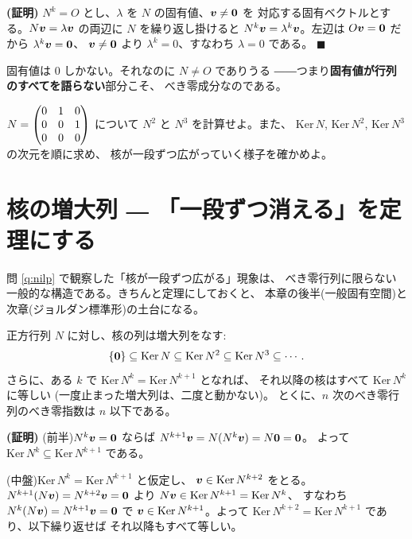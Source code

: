 \noindent\textbf{(証明)}\quad
$N^k = O$ とし、$\lambda$ を $N$ の固有値、$\bm{v} \neq \bm{0}$ を
対応する固有ベクトルとする。$N\bm{v} = \lambda\bm{v}$ の両辺に
$N$ を繰り返し掛けると $N^k\bm{v} = \lambda^k\bm{v}$。左辺は
$O\bm{v} = \bm{0}$ だから $\lambda^k\bm{v} = \bm{0}$、
$\bm{v} \neq \bm{0}$ より $\lambda^k = 0$、すなわち $\lambda = 0$ である。
$\blacksquare$

固有値は $0$ しかない。それなのに $N \neq O$ でありうる
――つまり\textbf{固有値が行列のすべてを語らない}部分こそ、
べき零成分なのである。

\begin{mondai}\label{q:nilp}
$N = \begin{pmatrix}0 & 1 & 0 \\ 0 & 0 & 1 \\ 0 & 0 & 0\end{pmatrix}$ について
$N^2$ と $N^3$ を計算せよ。また、
$\mathrm{Ker}\,N$, $\mathrm{Ker}\,N^2$, $\mathrm{Ker}\,N^3$ の次元を順に求め、
核が一段ずつ広がっていく様子を確かめよ。
\end{mondai}

\section{核の増大列 ― 「一段ずつ消える」を定理にする}

問 \ref{q:nilp} で観察した「核が一段ずつ広がる」現象は、
べき零行列に限らない一般的な構造である。きちんと定理にしておくと、
本章の後半(一般固有空間)と次章(ジョルダン標準形)の土台になる。

\begin{teiri}[核の増大列]\label{thm:nilp-chain}
正方行列 $N$ に対し、核の列は増大列をなす:
\[
\{\bm{0}\} \subseteq \mathrm{Ker}\,N \subseteq \mathrm{Ker}\,N^2
\subseteq \mathrm{Ker}\,N^3 \subseteq \cdots.
\]
さらに、ある $k$ で $\mathrm{Ker}\,N^k = \mathrm{Ker}\,N^{k+1}$ となれば、
それ以降の核はすべて $\mathrm{Ker}\,N^k$ に等しい
(一度止まった増大列は、二度と動かない)。
とくに、$n$ 次のべき零行列のべき零指数は $n$ 以下である。
\end{teiri}

\noindent\textbf{(証明)}\quad
(前半)$N^k\bm{v} = \bm{0}$ ならば
$N^{k+1}\bm{v} = N(N^k\bm{v}) = N\bm{0} = \bm{0}$。
よって $\mathrm{Ker}\,N^k \subseteq \mathrm{Ker}\,N^{k+1}$ である。

(中盤)$\mathrm{Ker}\,N^k = \mathrm{Ker}\,N^{k+1}$ と仮定し、
$\bm{v} \in \mathrm{Ker}\,N^{k+2}$ をとる。
$N^{k+1}(N\bm{v}) = N^{k+2}\bm{v} = \bm{0}$ より
$N\bm{v} \in \mathrm{Ker}\,N^{k+1} = \mathrm{Ker}\,N^k$、
すなわち $N^k(N\bm{v}) = N^{k+1}\bm{v} = \bm{0}$ で
$\bm{v} \in \mathrm{Ker}\,N^{k+1}$。よって
$\mathrm{Ker}\,N^{k+2} = \mathrm{Ker}\,N^{k+1}$ であり、以下繰り返せば
それ以降もすべて等しい。

